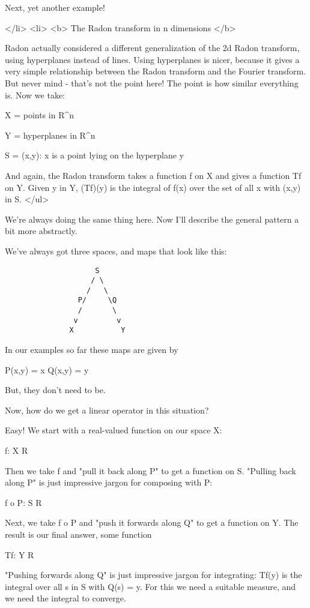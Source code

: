 Next, yet another example!

</li>
<li>
<b>
The Radon transform in n dimensions
</b>

Radon actually considered a different generalization of the
2d Radon transform, using hyperplanes instead of lines.  Using 
hyperplanes is nicer, because it gives a very simple relationship
between the Radon transform and the Fourier transform.  But never 
mind - that's not the point here!  The point is how similar
everything is.  Now we take:

X = {points in R^{n}}

Y = {hyperplanes in R^{n}}

S = {(x,y): x is a point lying on the hyperplane y}

And again, the Radon transform takes a function f on X 
and gives a function Tf on Y.  Given y in Y, (Tf)(y) is the 
integral of f(x) over the set of all x with (x,y) in S.
</ul>

We're always doing the same thing here.  Now I'll describe 
the general pattern a bit more abstractly.

We've always got three spaces, and maps that look like this:

\begin{verbatim}
                     S
                    / \
                   /   \
                 P/     \Q
                 /       \
                v         v 
               X           Y
\end{verbatim}
    
In our examples so far these maps are given by

P(x,y) = x
Q(x,y) = y

But, they don't need to be.

Now, how do we get a linear operator in this situation?  

Easy!  We start with a real-valued function on our space X:

f: X \to  R

Then we take f and "pull it back along P" to get a function on S.  
"Pulling back along P" is just impressive jargon for composing 
with P:

f o P: S \to  R

Next, we take f o P and "push it forwards along Q" to get a 
function on Y.  The result is our final answer, some function

Tf: Y \to  R

"Pushing forwards along Q" is just impressive jargon for 
integrating: Tf(y) is the integral over all s in S with Q(s) = y.
For this we need a suitable measure, and we need the integral
to converge.

